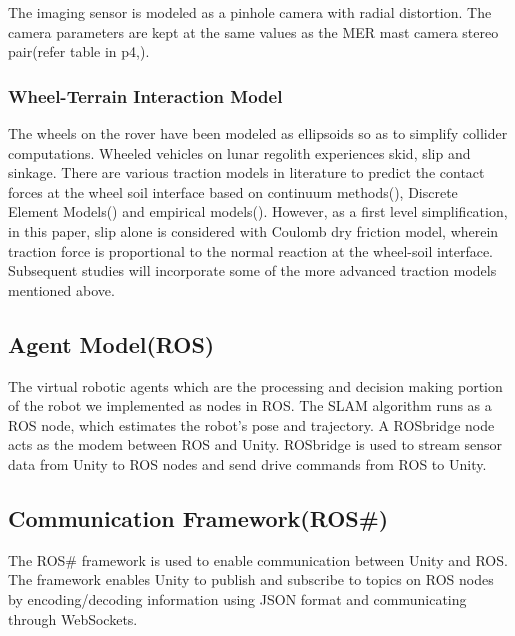 \documentclass[a4paper, 10pt, conference]{ieeeconf}      %
\begin{document}
The imaging sensor is modeled as a pinhole camera with radial distortion. The camera parameters are kept at the same values as  the MER mast camera stereo pair(refer table in p4,\cite{maki2003mars}).

\subsubsection{Wheel-Terrain Interaction Model}
The wheels on the rover have been modeled as ellipsoids so as to simplify collider computations. Wheeled vehicles on lunar regolith experiences skid, slip and sinkage\cite{ding2009slip}. There are various traction models in literature to predict the contact forces at the wheel soil interface based on continuum  methods(\cite{bekker1964mechanics,wong1967behaviour,ding2015interaction}), Discrete Element Models(\cite{yoshida2003terramechanics,jeong2019development,rodriguez2019high,jiang2018experimental,jeong2019development}) and empirical models(\cite{huang2019sinkage,wong2012predicting}).  However, as a first level simplification, in this paper, slip alone is considered with Coulomb dry friction model, wherein traction force is proportional to the normal reaction at the wheel-soil interface. Subsequent studies will incorporate some of the more advanced traction models mentioned above.
\subsection{Agent Model(ROS)}
The virtual robotic agents which are the processing and decision making portion of the robot we implemented as nodes in ROS. The SLAM algorithm runs as a ROS node, which estimates the robot's pose and trajectory. A ROSbridge node\cite{crick2017rosbridge} acts as the modem between ROS and Unity. ROSbridge is used to stream sensor data from Unity  to ROS nodes  and send drive commands from ROS to Unity.  
\subsection{Communication Framework(ROS\#)}
The ROS\# framework is used to enable communication between Unity and ROS. The framework enables Unity to publish and subscribe to topics on ROS nodes by encoding/decoding information using JSON format and communicating through WebSockets. 
\end{document}

